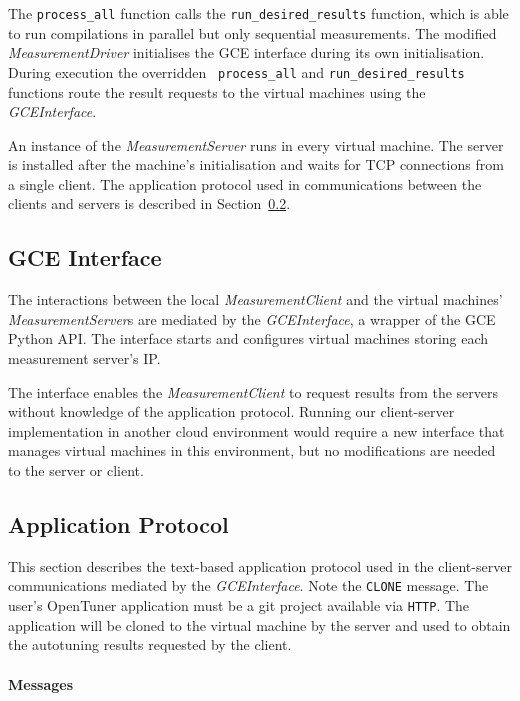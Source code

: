 \documentclass[12pt]{article}
\begin{document}
The \texttt{\footnotesize process\_all} function calls the
\texttt{\footnotesize run\_desired\_results} function, which is able to run
compilations in parallel but only sequential measurements.  The modified
\emph{MeasurementDriver} initialises the GCE interface during its own
initialisation. During execution the overridden \texttt{\footnotesize
process\_all} and \texttt{\footnotesize run\_desired\_results} functions route
the result requests to the virtual machines using the \emph{GCEInterface}.

An instance of the \emph{MeasurementServer} runs in every virtual machine. The
server is installed after the machine's initialisation and waits for TCP
connections from a single client. The application protocol used in
communications between the clients and servers is described in
Section~\ref{sec:app}.

\subsection{GCE Interface}
\label{sec:gce}

The interactions between the local \emph{MeasurementClient} and the virtual
machines' \emph{MeasurementServer}s are mediated by the
\emph{GCEInterface}, a wrapper of the GCE Python API.
The interface starts and configures virtual machines
storing each measurement server's IP.

The interface enables the \emph{MeasurementClient} to request results from
the servers without knowledge of the application protocol. Running our
client-server implementation in another cloud environment would require a
new interface that manages virtual machines in this environment, but no
modifications are needed to the server or client.

\subsection{Application Protocol}
\label{sec:app}

This section describes the text-based application protocol used in the
client-server communications mediated by the \emph{GCEInterface}. Note the
\texttt{\footnotesize CLONE} message. The user's OpenTuner application must
be a git project available via \texttt{\footnotesize{HTTP}}. The application
will be cloned to the virtual machine by the server and used to obtain the
autotuning results requested by the client.

\paragraph{Messages}

\end{document}
